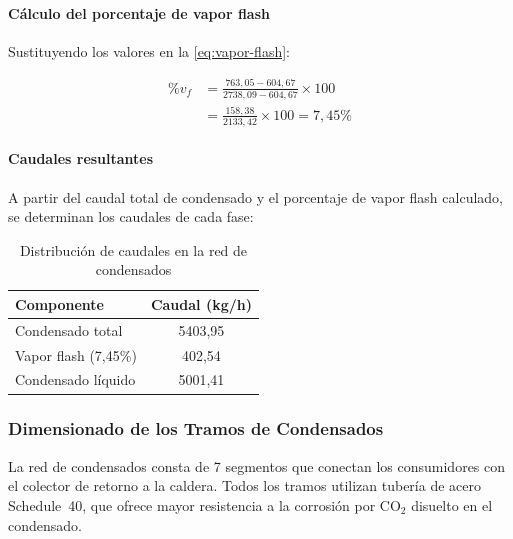 \documentclass[12pt]{article}
\begin{document}
\paragraph{Cálculo del porcentaje de vapor flash}

Sustituyendo los valores en la \autoref{eq:vapor-flash}:

\begin{equation}
	\begin{split}
		\%v_f & = \frac{763{,}05 - 604{,}67}{2738{,}09 - 604{,}67} \times 100 \\
		      & = \frac{158{,}38}{2133{,}42} \times 100 = 7{,}45\%
	\end{split}
	\label{eq:vapor-flash-resultado}
\end{equation}

\paragraph{Caudales resultantes}

A partir del caudal total de condensado y el porcentaje de vapor flash calculado, se determinan los caudales de cada fase:

\begin{table}[H]
	\centering
	\caption{Distribución de caudales en la red de condensados}
	\label{tab:caudales-condensados}
	\begin{tabular}{lc}
		\toprule
		\textbf{Componente}    & \textbf{Caudal (kg/h)} \\
		\midrule
		Condensado total       & 5403{,}95             \\
		Vapor flash (7{,}45\%) & 402{,}54               \\
		Condensado líquido     & 5001{,}41             \\
		\bottomrule
	\end{tabular}
\end{table}


\subsubsection{Dimensionado de los Tramos de Condensados}
\label{subsubsec:dimensionado-tramos-condensados}

La red de condensados consta de 7 segmentos que conectan los consumidores con el colector de retorno a la caldera. Todos los tramos utilizan tubería de acero Schedule~40, que ofrece mayor resistencia a la corrosión por CO$_2$ disuelto en el condensado.
\end{document}
